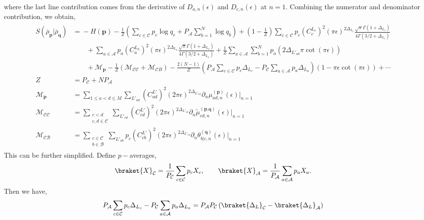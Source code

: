 \documentclass[11pt]{article}
\newcommand{\ep}{\epsilon}
\newcommand{\p}{\partial}
\newcommand{\lb}{\left(}
\newcommand{\rb}{\right)}
\begin{document}
where the last line contribution comes from the derivative of $D_{a,n}(\ep)$ and $D_{c,n}(\ep)$ at $n=1$.
Combining the numerator and denominator contribution, we obtain,
\begin{align}
\begin{aligned}
S(\bar\rho_{\textbf{p}} | \bar\rho_{\textbf{q}})
&={}-H(\textbf{p})
-\frac{1}{Z}\lb
\sum_{c\in\mathcal{C}}p_c\log q_c
+P_\mathcal{A}\sum_{b=1}^N\log q_b
\rb
+\lb1-\frac{1}{Z}\rb
\sum_{c\in\mathcal{C}}p_c {(C_c^{L_c})}^2
(\pi\ep)^{2\Delta_{L_c}}
\frac{\sqrt \pi \Gamma(1+ \Delta_{L_c})}{4\Gamma(3/2 + \Delta_{L_c})} 
\\
&\qquad
+\sum_{a\in\mathcal{A}}p_a {(C_a^{L_a})}^2
(\pi\ep)^{2\Delta_{L_a}}
\frac{\sqrt \pi \Gamma(1+ \Delta_{L_a})}{4\Gamma(3/2 + \Delta_{L_a})} 
+\frac{1}{Z}
\sum_{a\in\mathcal{A}}\sum_{b=1}^N
p_a\lb2\Delta_{L'_{ab}}\pi\cot(\pi\ep)\rb\\&\qquad
+\mathcal{M}_{\textbf{p}}
-\frac{1}{Z}\lb
\mathcal{M}_{\mathcal{C}\mathcal{C}}
+\mathcal{M}_{\mathcal{C}B}
\rb  -\frac{2(N-1)}{Z} \lb  P_\mathcal{A}\sum_{c\in\mathcal{C}} p_c\Delta_{L_c} - P_\mathcal{C} \sum_{a\in\mathcal{A}} p_a\Delta_{L_a} \rb (1-\pi \ep\cot(\pi\ep)) + \cdots\\
Z &=  P_\mathcal{C} + NP_\mathcal{A} \\
\mathcal{M}_\textbf{p} &= \sum_{1\leq a<d\leq M}\sum_{L'_{ad}} \lb C_{ad}^{L'}\rb^2 (2\pi\ep)^{2\Delta_{L'_{ad}}}\p_n\mu_{ad,n}^{(\textbf{p})}(\ep)\Big|_{n=1} \\ 
\mathcal{M}_{\mathcal{C}\mathcal{C}} &= \sum_{\substack{c<d \\ c,d\in \mathcal{C}}}\sum_{L'_{cd}} \lb C_{cd}^{L'}\rb^2 (2\pi\ep)^{2\Delta_{L'_{cd}}} \p_n\tilde \mu_{cd,n}^{(\textbf{p,q})}(\ep)\Big|_{n=1} \\
\mathcal{M}_{\mathcal{C}\mathcal{B}} &= \sum_{\substack{c\in \mathcal{C} \\ b\in \mathcal{B}}} \sum_{L'_{ab}} p_c\lb C^{L'}_{cb}\rb^2 (2\pi\ep)^{2\Delta_{L'_{cb}}}\p_n  \theta_{b|c,n}^{(\textbf{q})}(\ep) \Big|_{n=1}
\end{aligned}
\end{align}
This can be further simplified. Define $p-$averages, 
\begin{align}
    \braket{X}_\mathcal{C} = \frac{1}{P_\mathcal{C}} \sum_{c\in \mathcal{C}}p_c X_c, \qquad \braket{X}_\mathcal{A} = \frac{1}{P_\mathcal{A}} \sum_{a\in \mathcal{A}}p_a X_a.
\end{align}
Then we have,
\begin{align}
    P_\mathcal{A} \sum_{c\in \mathcal{C}}p_c \Delta_{L_c} - P_\mathcal{C}\sum_{a\in \mathcal{A}} p_a \Delta_{L_a} = P_\mathcal{A} P_\mathcal{C} \lb \braket{\Delta_L}_{\mathcal{C}} - \braket{\Delta_L}_\mathcal{A}\rb 
\end{align}
\end{document}
